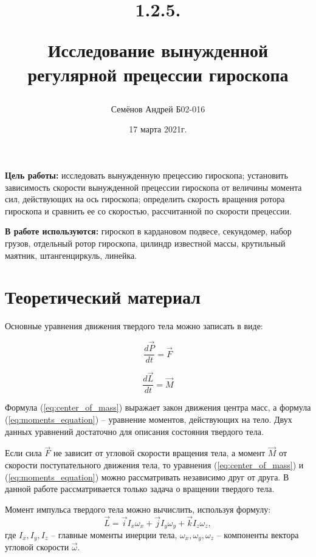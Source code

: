 \documentclass[12pt,a4paper]{article}
\title{
1.2.5.

Исследование вынужденной регулярной прецессии гироскопа
}
\author{Семёнов Андрей Б02-016}
\begin{document}
\date{17 марта 2021г.}
\maketitle

\newpage

	\textbf{Цель работы:} исследовать вынужденную прецессию гироскопа; установить зависимость скорости вынужденной прецессии гироскопа от величины момента сил, действующих на ось гироскопа; определить скорость вращения ротора гироскопа и сравнить ее со скоростью, рассчитанной по скорости прецессии.
	
	\textbf{В работе используются:} гироскоп в кардановом подвесе, секундомер, набор грузов, отдельный ротор гироскопа, цилиндр известной массы, крутильный маятник, штангенциркуль, линейка. 


\section{Теоретический материал}

Основные уравнения движения твердого тела можно записать в виде:

\begin{equation}
	\frac{d\vec{P}}{dt} = \vec{F}
	\label{eq:center_of_mass}
\end{equation}

\begin{equation}
	\frac{d\vec{L}}{dt} = \vec{M}
	\label{eq:moments_equation}
\end{equation}

Формула (\ref{eq:center_of_mass}) выражает закон движения центра масс, а формула (\ref{eq:moments_equation}) -- уравнение моментов, действующих на тело. Двух данных уравнений достаточно для описания состояния твердого тела.

Если сила $\vec{F}$ не зависит от угловой скорости вращения тела, а момент $\vec{M}$ от скорости поступательного движения тела, то уравнения (\ref{eq:center_of_mass}) и (\ref{eq:moments_equation}) можно рассматривать независимо друг от друга. В данной работе рассматривается только задача о вращении твердого тела.

Момент импульса твердого тела можно вычислить, используя формулу:
\begin{equation}
	\vec{L} = \vec{i}I_{x}\omega_{x} + \vec{j}I_{y}\omega_{y} + \vec{k}I_{z}\omega_{z},
\end{equation}
где $ I_{x},I_{y},I_{z} $ -- главные моменты инерции тела, $ \omega_{x}, \omega_{y}, \omega_{z} $ -- компоненты вектора угловой скорости  $\vec{\omega} $.
\end{document}
